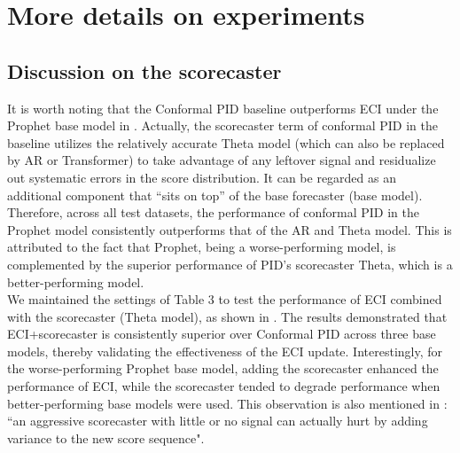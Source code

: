 \section{More details on experiments}
\label{More details on experiment}

\subsection{Discussion on the scorecaster}
\label{Discussion on the scorecaster}
It is worth noting that the Conformal PID baseline outperforms ECI under the Prophet base model in . Actually, the scorecaster term of conformal PID in the baseline utilizes the relatively accurate Theta model  (which can also be replaced by AR or Transformer) to take advantage of any leftover signal and residualize out systematic errors in the score distribution. It can be regarded as an additional component that “sits on top” of the base forecaster (base model). Therefore, across all test datasets, the performance of conformal PID in the Prophet model consistently outperforms that of the AR and Theta model. This is attributed to the fact that Prophet, being a worse-performing model, is complemented by the superior performance of PID's scorecaster Theta, which is a better-performing model. 
\\
We maintained the settings of Table 3 to test the performance of ECI combined with the scorecaster (Theta model), as shown in . The results demonstrated that ECI+scorecaster is consistently superior over Conformal PID across three base models, thereby validating the effectiveness of the ECI update. Interestingly, for the worse-performing Prophet base model, adding the scorecaster enhanced the performance of ECI, while the scorecaster tended to degrade performance when better-performing base models were used. This observation is also mentioned in \citet{pid_angelopoulos2024conformal}: ``an aggressive scorecaster with little or no signal can actually hurt by adding variance to the new score sequence".


